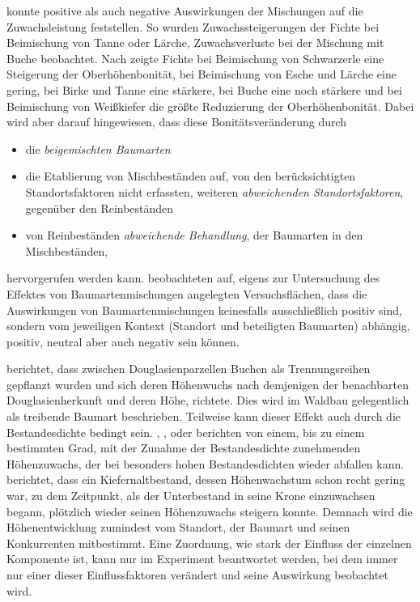 \documentclass[twocolumn]{scrartcl}
\begin{document}
\cite{vospernik2021grundflaechenzuwachs} konnte positive als auch
negative Auswirkungen der Mischungen auf die Zuwachsleistung
feststellen. So wurden Zuwachssteigerungen der Fichte bei Beimischung
von Tanne oder Lärche, Zuwachsverluste bei der Mischung mit Buche
beobachtet. Nach \cite{kindermann2018siteIndex} zeigte Fichte bei
Beimischung von Schwarzerle eine Steigerung der Oberhöhenbonität, bei
Beimischung von Esche und Lärche eine gering, bei Birke und Tanne eine
stärkere, bei Buche eine noch stärkere und bei Beimischung von
Weißkiefer die größte Reduzierung der Oberhöhenbonität. Dabei wird
aber darauf hingewiesen, dass diese Bonitätsveränderung durch
\begin{itemize}
\item die \emph{beigemischten Baumarten}
\item die Etablierung von Mischbeständen auf, von den berücksichtigten
  Standortsfaktoren nicht erfassten, weiteren \emph{abweichenden
    Standortsfaktoren}, gegenüber den Reinbeständen
\item von Reinbeständen \emph{abweichende Behandlung}, der Baumarten
  in den Mischbeständen,
\end{itemize}
hervorgerufen werden kann. \cite{vanclay2022competitioninMixedSpecies}
beobachteten auf, eigens zur Untersuchung des Effektes von Baumartenmischungen
angelegten Versuchsflächen, dass die Auswirkungen von Baumartenmischungen
keinesfalls ausschließlich positiv sind, sondern vom jeweiligen Kontext
(Standort und beteiligten Baumarten) abhängig, positiv, neutral aber auch
negativ sein können.

\citet[S.~259]{muench1928KlimarassenDerDouglasie} berichtet, dass zwischen
Douglasienparzellen Buchen als Trennungsreihen gepflanzt wurden und sich deren
Höhenwuchs nach demjenigen der benachbarten Douglasienherkunft und deren Höhe,
richtete. Dies wird im Waldbau gelegentlich als treibende Baumart beschrieben.
Teilweise kann dieser Effekt auch durch die Bestandesdichte bedingt sein.
\cite{boehmerle1903BestandesdichteUndBestandeshoehe},
\cite{schmied1928UeberDenEinflussDerBestandesdichteAufDieBestandeshoeheInJuengerenBuchenbestaenden},
\citet[S.~75\,f.]{wiedemann1951Ertragskunde} oder
\citet[S.~46\,f.]{assmann1961Waldertraskunde} berichten von einem, bis zu einem
bestimmten Grad, mit der Zunahme der Bestandesdichte zunehmenden Höhenzuwachs,
der bei besonders hohen Bestandesdichten wieder abfallen kann.
\cite{zundel1960ErtragskundlicheUntersuchungenInZweialtrigenBestaendenNordwuerttembergs}
berichtet, dass ein Kiefernaltbestand, dessen Höhenwachstum schon
recht gering war, zu dem Zeitpunkt, als der Unterbestand in seine
Krone einzuwachsen begann, plötzlich wieder seinen Höhenzuwachs steigern
konnte. Demnach wird die Höhenentwicklung zumindest vom Standort, der Baumart und seinen Konkurrenten mitbestimmt. Eine Zuordnung, wie stark der Einfluss der einzelnen Komponente ist, kann nur im Experiment beantwortet werden, bei dem immer nur einer dieser Einflussfaktoren verändert und seine Auswirkung beobachtet wird.
\end{document}
